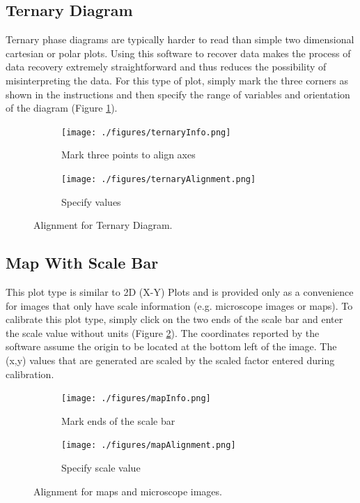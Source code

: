 \documentclass[letterpaper, 10pt]{article}
\begin{document}
\subsection{Ternary Diagram}
Ternary phase diagrams are typically harder to read than simple two dimensional cartesian or polar plots. Using this software to recover data makes the process of data recovery extremely straightforward and thus reduces the possibility of misinterpreting the data. For this type of plot, simply mark the three corners as shown in the instructions and then specify the range of variables and orientation of the diagram (Figure \ref{fig:ternaryAlignment}).

\begin{figure}
\centering
{\begin{subfigure}[b]{0.4\textwidth}
\texttt{[image: ./figures/ternaryInfo.png]}
\caption{Mark three points to align axes}
\end{subfigure}
\begin{subfigure}[b]{0.4\textwidth}
\texttt{[image: ./figures/ternaryAlignment.png]}
\caption{Specify values}
\end{subfigure}}
\caption{Alignment for Ternary Diagram.}
\label{fig:ternaryAlignment}
\end{figure}

\subsection{Map With Scale Bar}
This plot type is similar to 2D (X-Y) Plots and is provided only as a convenience for images that only have scale information (e.g. microscope images or maps). To calibrate this plot type, simply click on the two ends of the scale bar and enter the scale value without units (Figure \ref{fig:mapAlignment}). The coordinates reported by the software assume the origin to be located at the bottom left of the image. The (x,y) values that are generated are scaled by the scaled factor entered during calibration.

\begin{figure}
\centering
{\begin{subfigure}[b]{0.3\textwidth}
\texttt{[image: ./figures/mapInfo.png]}
\caption{Mark ends of the scale bar}
\end{subfigure}
\begin{subfigure}[b]{0.3\textwidth}
\texttt{[image: ./figures/mapAlignment.png]}
\caption{Specify scale value}
\end{subfigure}}
\caption{Alignment for maps and microscope images.}
\label{fig:mapAlignment}
\end{figure}
\end{document}
